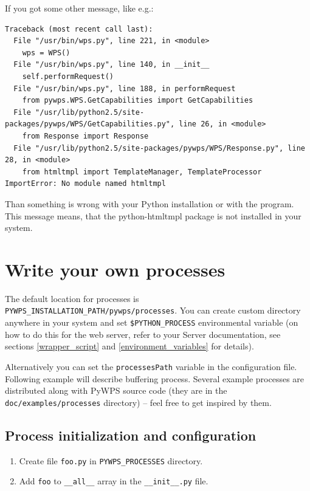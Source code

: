 \documentclass[a4paper,11pt]{report}
\begin{document}
If you got some other message, like e.g.:
     
\begin{verbatim}
Traceback (most recent call last):
  File "/usr/bin/wps.py", line 221, in <module>
    wps = WPS()
  File "/usr/bin/wps.py", line 140, in __init__
    self.performRequest()
  File "/usr/bin/wps.py", line 188, in performRequest
    from pywps.WPS.GetCapabilities import GetCapabilities
  File "/usr/lib/python2.5/site-packages/pywps/WPS/GetCapabilities.py", line 26, in <module>
    from Response import Response
  File "/usr/lib/python2.5/site-packages/pywps/WPS/Response.py", line 28, in <module>
    from htmltmpl import TemplateManager, TemplateProcessor
ImportError: No module named htmltmpl
\end{verbatim}

     
Than something is wrong with your Python installation or with the program.
This message means, that the python-htmltmpl package is not installed in
your system.
     
\chapter{Write your own processes}
\label{processes}
    
The default location for processes is \texttt{PYWPS\_INSTALLATION\_PATH/pywps/processes}. You can
create custom directory anywhere in your system and set
\texttt{\$PYTHON\_PROCESS} environmental variable (on how to do this for the web
server, refer to your Server documentation, see sections
\ref{wrapper_script} and \ref{environment_variables} for details).

Alternatively you can set the \texttt{processesPath} variable in the configuration file.
Following example will describe buffering process. Several example processes are 
distributed along with PyWPS source code (they are in the
\texttt{doc/examples/processes} directory) -- feel free to get inspired by
them.

\section{Process initialization and configuration}
\begin{enumerate}
\item Create file \texttt{foo.py} in \texttt{PYWPS\_PROCESSES} directory.
\item Add \texttt{foo} to \texttt{\_\_all\_\_} array in the \texttt{\_\_init\_\_.py}
file.
\end{enumerate}
    
\end{document}
